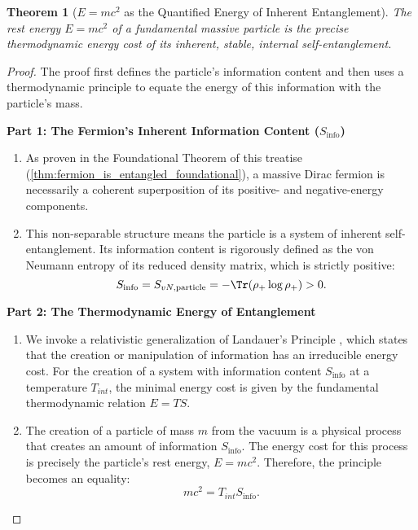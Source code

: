 \documentclass[11pt, letterpaper]{report}
\theoremstyle{plain} %
\newtheorem{theorem}{Theorem}[chapter]
\theoremstyle{definition} %
\theoremstyle{remark} %
\begin{document}
\begin{theorem}[$E=mc^2$ as the Quantified Energy of Inherent Entanglement]
\label{thm:emc2_is_entanglement_energy_revisited}
The rest energy $E=mc^2$ of a fundamental massive particle is the precise thermodynamic energy cost of its inherent, stable, internal self-entanglement.
\end{theorem}
\begin{proof}
The proof first defines the particle’s information content and then uses a thermodynamic principle to equate the energy of this information with the particle’s mass.

\textbf{Part 1: The Fermion’s Inherent Information Content ($S_{\text{info}}$)}
\begin{enumerate}
    \item As proven in the Foundational Theorem of this treatise (\cref{thm:fermion_is_entangled_foundational}), a massive Dirac fermion is necessarily a coherent superposition of its positive- and negative-energy components.
    \item This non-separable structure means the particle is a system of inherent self-entanglement. Its information content is rigorously defined as the von Neumann entropy of its reduced density matrix, which is strictly positive:
    \begin{equation}
        S_{\text{info}} = S_{vN, \text{particle}} = -\Tr(\rho_+ \log \rho_+) > 0.
    \end{equation}
\end{enumerate}
\textbf{Part 2: The Thermodynamic Energy of Entanglement}
\begin{enumerate}
    \item We invoke a relativistic generalization of Landauer's Principle \cite{Landauer1961}, which states that the creation or manipulation of information has an irreducible energy cost. For the creation of a system with information content $S_{\text{info}}$ at a temperature $T_{int}$, the minimal energy cost is given by the fundamental thermodynamic relation $E = T S$.
    \item The creation of a particle of mass $m$ from the vacuum is a physical process that creates an amount of information $S_{\text{info}}$. The energy cost for this process is precisely the particle's rest energy, $E=mc^2$. Therefore, the principle becomes an equality:
    \begin{equation}
        mc^2 = T_{int} S_{\text{info}}.
        \label{eq:mass_from_landauer_revisited}
    \end{equation}

\end{enumerate}
\end{proof}
\end{document}

